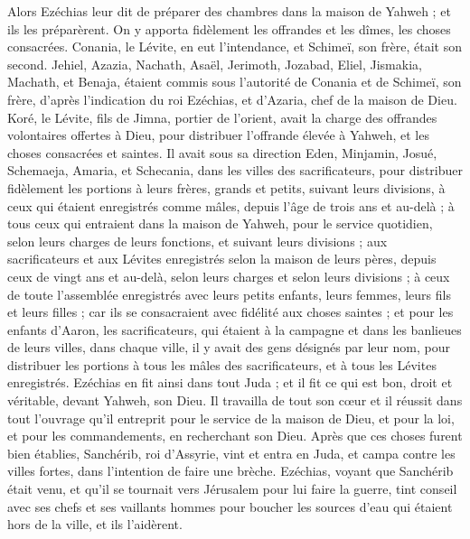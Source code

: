 \begin{multicols}{2}
Alors Ezéchias leur dit de préparer des chambres dans la maison de Yahweh ; et ils les préparèrent.
On y apporta fidèlement les offrandes et les dîmes, les choses consacrées. Conania, le Lévite, en eut l'intendance, et Schimeï, son frère, était son second.
Jehiel, Azazia, Nachath, Asaël, Jerimoth, Jozabad, Eliel, Jismakia, Machath, et Benaja, étaient commis sous l'autorité de Conania et de Schimeï, son frère, d’après l’indication du roi Ezéchias, et d'Azaria, chef de la maison de Dieu.
Koré, le Lévite, fils de Jimna, portier de l'orient, avait la charge des offrandes volontaires offertes à Dieu, pour distribuer l'offrande élevée à Yahweh, et les choses consacrées et saintes.
Il avait sous sa direction Eden, Minjamin, Josué, Schemaeja, Amaria, et Schecania, dans les villes des sacrificateurs, pour distribuer fidèlement les portions à leurs frères, grands et petits, suivant leurs divisions,
à ceux qui étaient enregistrés comme mâles, depuis l'âge de trois ans et au-delà ; à tous ceux qui entraient dans la maison de Yahweh, pour le service quotidien, selon leurs charges de leurs fonctions, et suivant leurs divisions ;
aux sacrificateurs et aux Lévites enregistrés selon la maison de leurs pères, depuis ceux de vingt ans et au-delà, selon leurs charges et selon leurs divisions ;
à ceux de toute l'assemblée enregistrés avec leurs petits enfants, leurs femmes, leurs fils et leurs filles ; car ils se consacraient avec fidélité aux choses saintes ;
et pour les enfants d'Aaron, les sacrificateurs, qui étaient à la campagne et dans les banlieues de leurs villes, dans chaque ville, il y avait des gens désignés par leur nom, pour distribuer les portions à tous les mâles des sacrificateurs, et à tous les Lévites enregistrés.
Ezéchias en fit ainsi dans tout Juda ; et il fit ce qui est bon, droit et véritable, devant Yahweh, son Dieu.
Il travailla de tout son cœur et il réussit dans tout l'ouvrage qu'il entreprit pour le service de la maison de Dieu, et pour la loi, et pour les commandements, en recherchant son Dieu.
\VerseOne{}Après que ces choses furent bien établies, Sanchérib, roi d’Assyrie, vint et entra en Juda, et campa contre les villes fortes, dans l'intention de faire une brèche.
Ezéchias, voyant que Sanchérib était venu, et qu'il se tournait vers Jérusalem pour lui faire la guerre,
tint conseil avec ses chefs et ses vaillants hommes pour boucher les sources d'eau qui étaient hors de la ville, et ils l'aidèrent.

\end{multicols}

